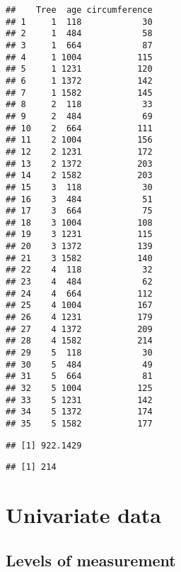 \documentclass[
]{book}
\newenvironment{Shaded}{\begin{snugshade}}{\end{snugshade}}
\newcommand{\FunctionTok}[1]{\textcolor[rgb]{0.00,0.00,0.00}{#1}}
\newcommand{\NormalTok}[1]{#1}
\newcommand{\SpecialCharTok}[1]{\textcolor[rgb]{0.00,0.00,0.00}{#1}}
\theoremstyle{definition}
\theoremstyle{definition}
\theoremstyle{definition}
\theoremstyle{definition}
\theoremstyle{remark}
\begin{document}
\begin{verbatim}
##    Tree  age circumference
## 1     1  118            30
## 2     1  484            58
## 3     1  664            87
## 4     1 1004           115
## 5     1 1231           120
## 6     1 1372           142
## 7     1 1582           145
## 8     2  118            33
## 9     2  484            69
## 10    2  664           111
## 11    2 1004           156
## 12    2 1231           172
## 13    2 1372           203
## 14    2 1582           203
## 15    3  118            30
## 16    3  484            51
## 17    3  664            75
## 18    3 1004           108
## 19    3 1231           115
## 20    3 1372           139
## 21    3 1582           140
## 22    4  118            32
## 23    4  484            62
## 24    4  664           112
## 25    4 1004           167
## 26    4 1231           179
## 27    4 1372           209
## 28    4 1582           214
## 29    5  118            30
## 30    5  484            49
## 31    5  664            81
## 32    5 1004           125
## 33    5 1231           142
## 34    5 1372           174
## 35    5 1582           177
\end{verbatim}

\begin{Shaded}
\end{Shaded}

\begin{verbatim}
## [1] 922.1429
\end{verbatim}

\begin{Shaded}
\end{Shaded}

\begin{verbatim}
## [1] 214
\end{verbatim}

\hypertarget{univariate}{%
\chapter{Univariate data}\label{univariate}}

\hypertarget{levels-of-measurement}{%
\section*{Levels of measurement}\label{levels-of-measurement}}
\end{document}
